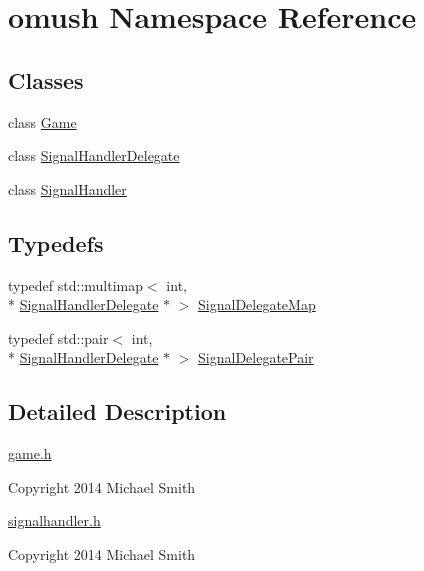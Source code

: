 \hypertarget{namespaceomush}{\section{omush Namespace Reference}
\label{namespaceomush}
}
\subsection*{Classes}
\begin{DoxyCompactItemize}
\item 
class \hyperlink{classomush_1_1_game}{Game}
\item 
class \hyperlink{classomush_1_1_signal_handler_delegate}{Signal\-Handler\-Delegate}
\item 
class \hyperlink{classomush_1_1_signal_handler}{Signal\-Handler}
\end{DoxyCompactItemize}
\subsection*{Typedefs}
\begin{DoxyCompactItemize}
\item 
typedef std\-::multimap$<$ int, \\*
\hyperlink{classomush_1_1_signal_handler_delegate}{Signal\-Handler\-Delegate} $\ast$ $>$ \hyperlink{namespaceomush_a1d7529318966c643d1dd1eec7d619ebc}{Signal\-Delegate\-Map}
\item 
typedef std\-::pair$<$ int, \\*
\hyperlink{classomush_1_1_signal_handler_delegate}{Signal\-Handler\-Delegate} $\ast$ $>$ \hyperlink{namespaceomush_ac30cad3dc5c8f3a450a56b1fcc88028d}{Signal\-Delegate\-Pair}
\end{DoxyCompactItemize}


\subsection{Detailed Description}
\hyperlink{game_8h_source}{game.\-h}

Copyright 2014 Michael Smith

\hyperlink{signalhandler_8h_source}{signalhandler.\-h}

Copyright 2014 Michael Smith 

